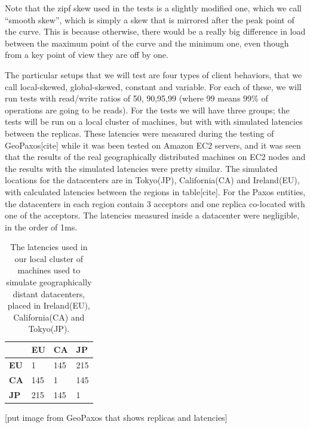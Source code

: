 Note that the zipf skew used in the tests is a slightly modified one, which we call ``smooth skew'', which is simply a skew that is mirrored after the peak point of the curve. This is because otherwise, there would be a really big difference in load between the maximum point of the curve and the minimum one, even though from a key point of view they are off by one.

The particular setups that we will test are four types of client behaviors, that we call local-skewed, global-skewed, constant and variable. For each of these, we will run tests with read/write ratios of 50, 90,95,99 (where 99 means 99\% of operations are going to be reads). For the tests we will have three groups; the tests will be run on a local cluster of machines, but with with simulated latencies between the replicas. These latencies were measured during the testing of GeoPaxos[cite] while it was been tested on Amazon EC2 servers, and it was seen that the results of the real geographically distributed machines on EC2 nodes and the results with the simulated latencies were pretty similar. The simulated locations for the datacenters are in Tokyo(JP), California(CA) and Ireland(EU), with calculated latencies between the regions in table[cite]. For the Paxos entities, the datacenters in each region contain 3 acceptors and one replica co-located with one of the acceptors. The latencies measured inside a datacenter were negligible, in the order of 1ms.


\begin{table}[htb]
  \centering
  \begin{tabular}{l l l l}
    \hline
    & \textbf{EU} & \textbf{CA} & \textbf{JP} \\
    \hline
    \textbf{EU} & 1 & 145 & 215 \\
    \textbf{CA} & 145 & 1 & 145 \\
    \textbf{JP} & 215 & 145 & 1 \\
    \hline
  \end{tabular}
  \caption{The latencies used in our local cluster of machines used to simulate geographically distant datacenters, placed in Ireland(EU), California(CA) and Tokyo(JP).}\label{tab:latencies}
\end{table}

[put image from GeoPaxos that shows replicas and latencies]


